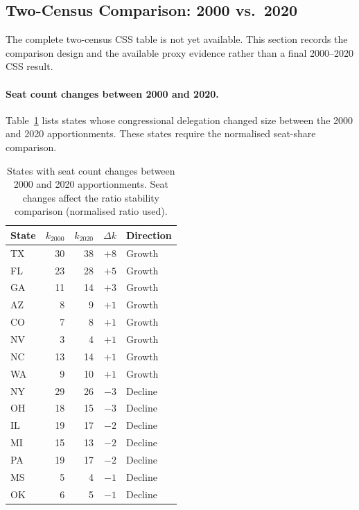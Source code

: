 \subsection{Two-Census Comparison: 2000 vs.\ 2020}
\label{sec:two-census}

The complete two-census CSS table is not yet available.
This section records the comparison design and the available proxy evidence
rather than a final 2000--2020 CSS result.

\paragraph{Seat count changes between 2000 and 2020.}
Table~\ref{tab:seat-changes} lists states whose congressional delegation
changed size between the 2000 and 2020 apportionments.
These states require the normalised seat-share comparison.

\begin{table}[h]
\centering
\caption{States with seat count changes between 2000 and 2020 apportionments.
  Seat changes affect the ratio stability comparison (normalised ratio used).}
\label{tab:seat-changes}
\small
\begin{tabular}{l r r r l}
\toprule
State & $k_{2000}$ & $k_{2020}$ & $\Delta k$ & Direction \\
\midrule
TX & 30 & 38 & $+8$ & Growth \\
FL & 23 & 28 & $+5$ & Growth \\
GA & 11 & 14 & $+3$ & Growth \\
AZ &  8 &  9 & $+1$ & Growth \\
CO &  7 &  8 & $+1$ & Growth \\
NV &  3 &  4 & $+1$ & Growth \\
NC & 13 & 14 & $+1$ & Growth \\
WA &  9 & 10 & $+1$ & Growth \\
NY & 29 & 26 & $-3$ & Decline \\
OH & 18 & 15 & $-3$ & Decline \\
IL & 19 & 17 & $-2$ & Decline \\
MI & 15 & 13 & $-2$ & Decline \\
PA & 19 & 17 & $-2$ & Decline \\
MS &  5 &  4 & $-1$ & Decline \\
OK &  6 &  5 & $-1$ & Decline \\
\bottomrule
\end{tabular}
\end{table}

